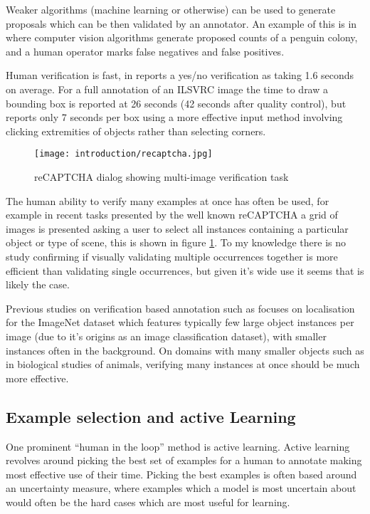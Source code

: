 Weaker algorithms (machine learning or otherwise) can be used to generate proposals which can be then validated by an annotator. An example of this is in \cite{McNeill2011} where computer vision algorithms generate proposed counts of a penguin colony, and a human operator marks false negatives and false positives.

Human verification is fast, in \cite{Papadopoulos2016} reports a yes/no verification as taking 1.6 seconds on average. For a full annotation of an \gls{ILSVRC} image \cite {Su2012a} the time to draw a bounding box is reported at 26 seconds (42 seconds after quality control), but \cite{Papadopoulos2017} reports only 7 seconds per box using a more effective input method involving clicking extremities of objects rather than selecting corners. 

\begin{figure}[h]
  \centering
  \texttt{[image: introduction/recaptcha.jpg]}
  \caption{reCAPTCHA dialog showing multi-image verification task}  
  \label{fig:captcha}
\end{figure}

The human ability to verify many examples at once has often be used, for example in recent tasks presented by the well known reCAPTCHA \cite{von2008recaptcha} a grid of images is presented asking a user to select all instances containing a particular object or type of scene, this is shown in figure \ref{fig:captcha}. To my knowledge there is no study confirming if visually validating multiple occurrences together is more efficient than validating single occurrences, but given it's wide use it seems that is likely the case. 

Previous studies on verification based annotation such as \cite{Papadopoulos2016} focuses on localisation for the ImageNet dataset which features typically few large object instances per image (due to it's origins as an image classification dataset), with smaller instances often in the background. On domains with many smaller objects such as in biological studies of animals, verifying many instances at once should be much more effective. 


\subsection{Example selection and active Learning}

One prominent ``human in the loop'' method is active learning. Active learning revolves around picking the best set of examples for a human to annotate making most effective use of their time. Picking the best examples is often based around an uncertainty measure, where examples which a model is most uncertain about would often be the hard cases which are most useful for learning. 
 
